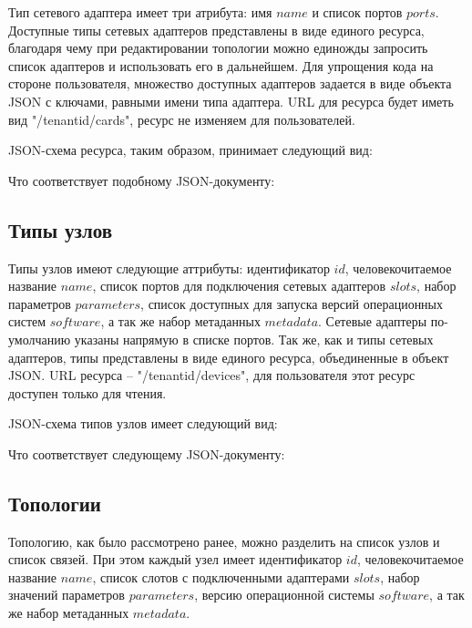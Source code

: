 Тип сетевого адаптера имеет три атрибута: имя $name$ и список портов $ports$. 
Доступные типы сетевых адаптеров представлены
в виде единого ресурса, благодаря чему при редактировании топологии можно единожды
запросить список адаптеров и использовать его в дальнейшем.  Для упрощения кода на стороне 
пользователя, множество доступных адаптеров задается в виде объекта JSON с ключами,
равными имени типа адаптера. URL для ресурса будет иметь вид "/{tenantid}/cards", ресурс не изменяем
для пользователей. 

JSON-схема ресурса, таким образом, принимает следующий вид:



Что соответствует подобному JSON-документу:




\subsection{Типы узлов}

Типы узлов имеют следующие аттрибуты: идентификатор $id$, человекочитаемое название
$name$, список портов для подключения сетевых адаптеров $slots$, 
набор параметров $parameters$, список доступных для запуска версий операционных систем 
$software$, а так же набор метаданных $metadata$. Сетевые адаптеры
по-умолчанию указаны напрямую в списке портов.
Так же, как и типы сетевых адаптеров, типы представлены в виде единого ресурса, объединенные в 
объект JSON. URL ресурса -- "/{tenantid}/devices", для пользователя этот ресурс доступен только для чтения.

JSON-схема типов узлов имеет следующий вид:



Что соответствует следующему JSON-документу:




\subsection{Топологии}



Топологию, как было рассмотрено ранее, можно разделить на список узлов и список 
связей. При этом каждый узел имеет идентификатор $id$, человекочитаемое название
$name$, список слотов с подключенными адаптерами $slots$, 
набор значений параметров $parameters$, версию операционной системы $software$, 
а так же набор метаданных $metadata$. 

